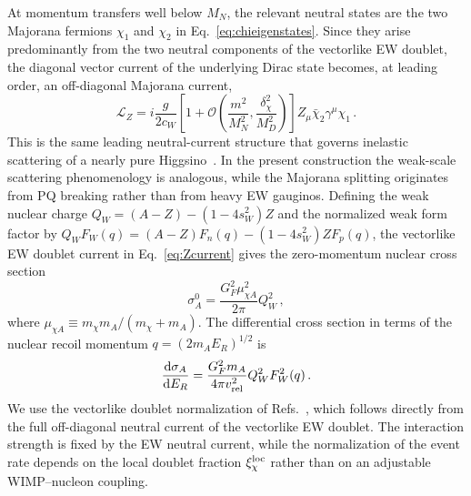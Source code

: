 \documentclass[aps,prd,reprint,preprintnumbers,superscriptaddress,nofootinbib,floatfix]{revtex4-2}
\newcommand{\dchi}{\delta_\chi}
\newcommand{\dd}{\mathrm{d}}
\begin{document}
At momentum transfers well below $M_N$, the relevant neutral states are the two Majorana fermions $\chi_1$ and $\chi_2$ in Eq.~\eqref{eq:chieigenstates}. Since they arise predominantly from the two neutral components of the vectorlike EW doublet, the diagonal vector current of the underlying Dirac state becomes, at leading order, an off-diagonal Majorana current,
\begin{equation}
    \mathcal L_Z=i\frac{g}{2c_W} \left[1+\mathcal O\!\left(\frac{m^2}{M_N^2},\frac{\dchi^2}{M_D^2}\right)\right]Z_\mu\bar\chi_2\gamma^\mu\chi_1\,.
    \label{eq:Zcurrent}
\end{equation}
This is the same leading neutral-current structure that governs inelastic scattering of a nearly pure Higgsino~\cite{Fan:2026kxx, Freese:2026sga, Wu:2026nhi, Smirnov:2026aqk}. In the present construction the weak-scale scattering phenomenology is analogous, while the Majorana splitting originates from PQ breaking rather than from heavy EW gauginos. Defining the weak nuclear charge $Q_W=(A-Z)-(1-4s_W^2)Z$ and the normalized weak form factor by $Q_WF_W(q)=(A-Z)F_n(q)-(1-4s_W^2)ZF_p(q)$, the vectorlike EW doublet current in Eq.~\eqref{eq:Zcurrent} gives the zero-momentum nuclear cross section
\begin{equation}
    \sigma_A^0 = \frac{G_F^2\mu_{\chi A}^2}{2\pi}Q_W^2\,,
    \label{eq:sigmaA}
\end{equation}
where $\mu_{\chi A}\equiv m_\chi m_A/(m_\chi+m_A)$. The differential cross section in terms of the nuclear recoil momentum $q=(2m_AE_R)^{1/2}$ is
\begin{equation}
    \frac{\dd\sigma_A}{\dd E_R} = \frac{G_F^2m_A}{4\pi v_{\rm rel}^2}Q_W^2F_W^2(q)\,.
    \label{eq:dsigma}
\end{equation}
We use the vectorlike doublet normalization of Refs.~\cite{Essig:2007az, Pospelov:2026ewn, Rodd:2026tyn}, which follows directly from the full off-diagonal neutral current of the vectorlike EW doublet. The interaction strength is fixed by the EW neutral current, while the normalization of the event rate depends on the local doublet fraction $\xi_\chi^{\rm loc}$ rather than on an adjustable WIMP--nucleon coupling.
\end{document}

